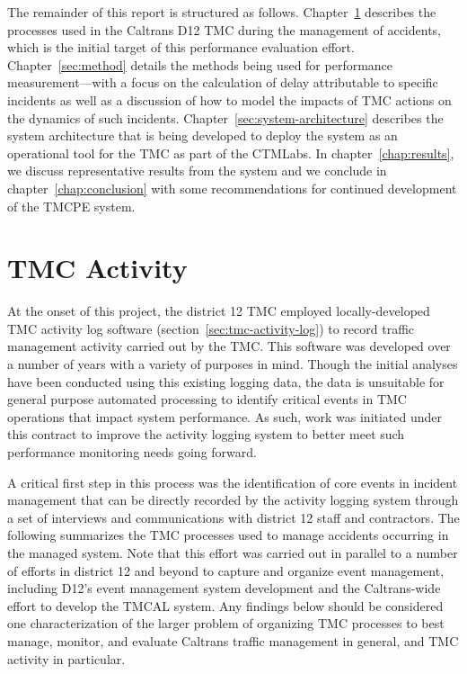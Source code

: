 \documentclass[12pt]{report}
\begin{document}
The remainder of this report is structured as follows.
Chapter~\ref{chap:tmc-activity} describes the processes used in the Caltrans \ac{D12}
\ac{TMC} during the management of accidents, which is the initial target of this
performance evaluation effort.  Chapter~\ref{sec:method} details the methods
being used for performance measurement---with a focus on the calculation of
delay attributable to specific incidents as well as a discussion of how to model
the impacts of \ac{TMC} actions on the dynamics of such incidents.
Chapter~\ref{sec:system-architecture} describes the system
architecture that is being developed to deploy the system as an
operational tool for the \ac{TMC} as part of the \ac{CTMLabs}.  In
chapter~\ref{chap:results}, we discuss representative results from the
system and we conclude in chapter~\ref{chap:conclusion} with some
recommendations for continued development of the \ac{TMCPE} system.

\chapter{TMC Activity}
\label{chap:tmc-activity}

At the onset of this project, the district 12 \ac{TMC} employed
locally-developed \ac{TMC} activity log software
(section~\ref{sec:tmc-activity-log}) to record traffic management
activity carried out by the \ac{TMC}.  This software was developed
over a number of years with a variety of purposes in mind.  Though the
initial analyses have been conducted using this existing logging data,
the data is unsuitable for general purpose automated processing to
identify critical events in \ac{TMC} operations that impact system
performance.  As such, work was initiated under this contract to
improve the activity logging system to better meet such performance
monitoring needs going forward.

A critical first step in this process was the identification of core
events in incident management that can be directly recorded by the
activity logging system through a set of interviews and communications
with district 12 staff and contractors.  The following summarizes the
\ac{TMC} processes used to manage accidents occurring in the managed
system.  Note that this effort was carried out in parallel to a number
of efforts in district 12 and beyond to capture and organize event
management, including \acs{D12}'s event management system development
and the Caltrans-wide effort to develop the \ac{TMCAL} system.  Any
findings below should be considered one characterization of the larger
problem of organizing \ac{TMC} processes to best manage, monitor, and
evaluate Caltrans traffic management in general, and \ac{TMC} activity
in particular.
\end{document}
